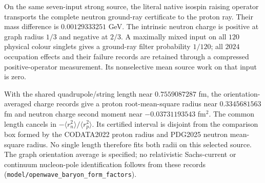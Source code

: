 On the same seven-input strong source, the literal native isospin raising
operator transports the complete neutron ground-ray certificate to the
proton ray. Their mass difference is $0.00129333251$ GeV. The intrinsic
neutron charge is positive at graph radius $1/3$ and negative at $2/3$.
A maximally mixed input on all $120$ physical colour singlets gives a
ground-ray filter probability $1/120$; all $2024$ occupation effects and
their failure records are retained through a compressed positive-operator
measurement. Its nonselective mean source work on that input is zero.

With the shared quadrupole/string length near $0.7559087287$ fm, the
orientation-averaged charge records give a proton root-mean-square radius
near $0.3345681563$ fm and neutron charge second moment near
$-0.03731193543$ fm$^2$. The common length cancels in
$-\langle r_n^2\rangle/\langle r_p^2\rangle$. Its certified interval is
disjoint from the comparison box formed by the CODATA2022 proton radius
and PDG2025 neutron mean-square radius. No single length therefore fits
both radii on this selected source. The graph orientation average is
specified; no relativistic Sachs-current or continuum nucleon-pole
identification follows from these records
(\texttt{model/openwave\_baryon\_form\_factors}).
